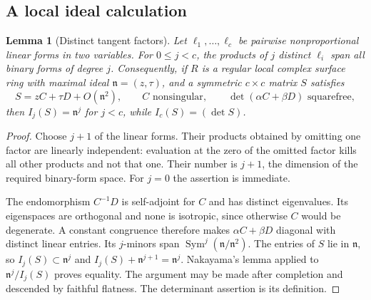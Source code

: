 \documentclass[11pt,reqno]{amsart}
\numberwithin{equation}{section}
\newtheorem{lemma}[theorem]{Lemma}
\theoremstyle{definition}\newtheorem{definition}[theorem]{Definition}
\theoremstyle{remark}\newtheorem{remark}[theorem]{Remark}
\DeclareMathOperator{\Sym}{Sym}\DeclareMathOperator{\Gr}{Gr}
\begin{document}
\subsection{A local ideal calculation}
\begin{lemma}[Distinct tangent factors]
\label{lem:tangent-factors-v159}
Let $\ell_1,\ldots,\ell_c$ be pairwise nonproportional linear forms
in two variables. For $0\leq j<c$, the products of $j$ distinct
$\ell_i$ span all binary forms of degree $j$. Consequently, if
$R$ is a regular local complex surface ring with maximal ideal
$\mathfrak n=(z,\tau)$, and a symmetric $c\times c$ matrix $S$ satisfies
\[
 S=zC+\tau D+O(\mathfrak n^2),
 \qquad C\text{ nonsingular},\qquad
 \det(\alpha C+\beta D)\text{ squarefree},
\]
then $I_j(S)=\mathfrak n^j$ for $j<c$, while
$I_c(S)=(\det S)$.
\end{lemma}
\begin{proof}
Choose $j+1$ of the linear forms. Their products obtained by omitting
one factor are linearly independent: evaluation at the zero of the
omitted factor kills all other products and not that one. Their
number is $j+1$, the dimension of the required binary-form space.
For $j=0$ the assertion is immediate.

The endomorphism $C^{-1}D$ is self-adjoint for $C$ and has distinct
eigenvalues. Its eigenspaces are orthogonal and none is isotropic,
since otherwise $C$ would be degenerate. A constant congruence
therefore makes $\alpha C+\beta D$ diagonal with distinct linear
entries. Its $j$-minors span $\Sym^j(\mathfrak n/\mathfrak n^2)$.
The entries of $S$ lie in $\mathfrak n$, so
$I_j(S)\subset\mathfrak n^j$ and
$I_j(S)+\mathfrak n^{j+1}=\mathfrak n^j$. Nakayama's lemma applied
to $\mathfrak n^j/I_j(S)$ proves equality. The argument may be made
after completion and descended by faithful flatness. The determinant
assertion is its definition.
\end{proof}
\end{document}
